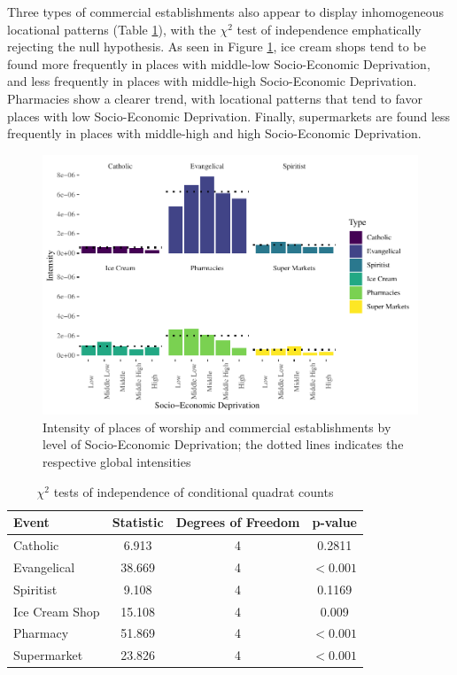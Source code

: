 \documentclass[smallextended]{svjour3}       %
\begin{document}
Three types of commercial establishments also appear to display
inhomogeneous locational patterns (Table
\ref{tab:quadrat-test-statistics}), with the \(\chi^2\) test of
independence emphatically rejecting the null hypothesis. As seen in
Figure \ref{fig:plot-events-quadrat}, ice cream shops tend to be found
more frequently in places with middle-low Socio-Economic Deprivation,
and less frequently in places with middle-high Socio-Economic
Deprivation. Pharmacies show a clearer trend, with locational patterns
that tend to favor places with low Socio-Economic Deprivation. Finally,
supermarkets are found less frequently in places with middle-high and
high Socio-Economic Deprivation.

\begin{figure}
\centering
\includegraphics{Moral_Communities_and_Crime_v1_files/figure-latex/plot-events-quadrat-1.pdf}
\caption{\label{fig:plot-events-quadrat}Intensity of places of worship
and commercial establishments by level of Socio-Economic Deprivation;
the dotted lines indicates the respective global intensities}
\end{figure}

\begin{table}

\caption{\label{tab:table-quadrat-test-statistics}\label{tab:quadrat-test-statistics}$\chi^2$ tests of independence of conditional quadrat counts}
\centering
\begin{tabular}[t]{lccc}
\toprule
Event & Statistic & Degrees of Freedom & p-value\\
\midrule
Catholic & 6.913 & 4 & 0.2811\\
Evangelical & 38.669 & 4 & $<0.001$\\
Spiritist & 9.108 & 4 & 0.1169\\
Ice Cream Shop & 15.108 & 4 & 0.009\\
Pharmacy & 51.869 & 4 & $<0.001$\\
\addlinespace
Supermarket & 23.826 & 4 & $<0.001$\\
\bottomrule
\end{tabular}
\end{table}
\end{document}
